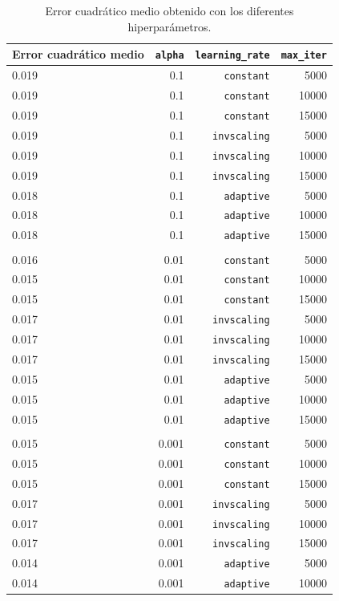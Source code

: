 \documentclass[a4paper, 20pt]{article}
\begin{document}
{\begin{table}[H]
\large
\centering
\caption{Error cuadrático medio obtenido con los diferentes hiperparámetros.}
\label{tab:r}
\begin{tabular}{lrrr}
\toprule
Error cuadrático medio & \texttt{alpha} & \texttt{learning\_rate} & \texttt{max\_iter}\\ \midrule
0.019 & 0.1 & \texttt{constant} & 5000\\
0.019 & 0.1 & \texttt{constant} & 10000\\
0.019 & 0.1 & \texttt{constant} & 15000\\
0.019 & 0.1 & \texttt{invscaling} & 5000\\
0.019 & 0.1 & \texttt{invscaling} & 10000\\
0.019 & 0.1 & \texttt{invscaling} & 15000\\
0.018 & 0.1 & \texttt{adaptive} & 5000\\
0.018 & 0.1 & \texttt{adaptive} & 10000\\
0.018 & 0.1 & \texttt{adaptive} & 15000\\\\[-10pt]
0.016 & 0.01 &\texttt{constant} & 5000\\
0.015 & 0.01 &\texttt{constant} & 10000\\
0.015 & 0.01 &\texttt{constant} & 15000\\
0.017 & 0.01 &\texttt{invscaling} & 5000\\
0.017 & 0.01 &\texttt{invscaling} & 10000\\
0.017 & 0.01 &\texttt{invscaling} & 15000\\
0.015 & 0.01 &\texttt{adaptive} & 5000\\
0.015 & 0.01 &\texttt{adaptive} & 10000\\
0.015 & 0.01 &\texttt{adaptive} & 15000\\\\[-10pt]
0.015 & 0.001 &\texttt{constant} & 5000\\
0.015 & 0.001 &\texttt{constant} & 10000\\
0.015 & 0.001 &\texttt{constant} & 15000\\
0.017 & 0.001 &\texttt{invscaling} & 5000\\
0.017 & 0.001 &\texttt{invscaling} & 10000\\
0.017 & 0.001 &\texttt{invscaling} & 15000\\
0.014 & 0.001 &\texttt{adaptive} & 5000\\
0.014 & 0.001 &\texttt{adaptive} & 10000\\

\end{tabular}
\end{table}}
\end{document}
